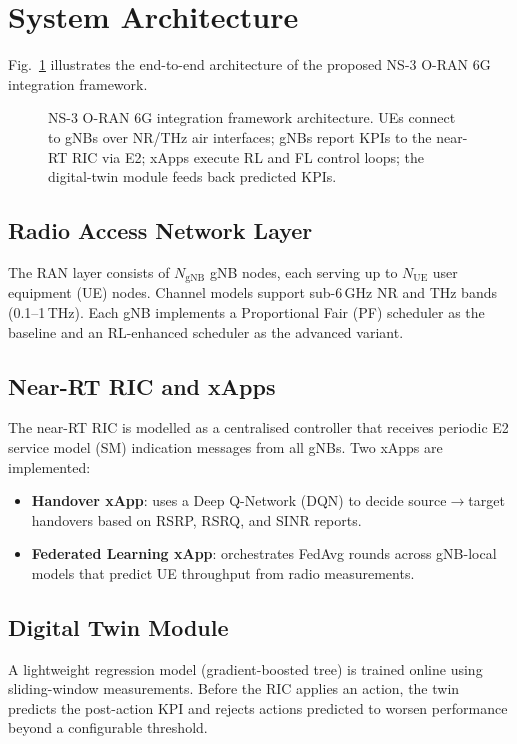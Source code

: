 \section{System Architecture}
\label{sec:architecture}

Fig.~\ref{fig:architecture} illustrates the end-to-end architecture of the
proposed NS-3 O-RAN 6G integration framework.

\begin{figure}[htbp]
  \centering
  
  \caption{NS-3 O-RAN 6G integration framework architecture. UEs connect
           to gNBs over NR/THz air interfaces; gNBs report KPIs to the
           near-RT RIC via E2; xApps execute RL and FL control loops;
           the digital-twin module feeds back predicted KPIs.}
  \label{fig:architecture}
\end{figure}

\subsection{Radio Access Network Layer}
The RAN layer consists of \(N_{\text{gNB}}\) gNB nodes, each serving up
to \(N_{\text{UE}}\) user equipment (UE) nodes.
Channel models support sub-6\,GHz NR and THz bands (0.1--1\,THz).
Each gNB implements a Proportional Fair (PF) scheduler as the baseline and
an RL-enhanced scheduler as the advanced variant.

\subsection{Near-RT RIC and xApps}
The near-RT RIC is modelled as a centralised controller that receives
periodic E2 service model (SM) indication messages from all gNBs.
Two xApps are implemented:
\begin{itemize}
  \item \textbf{Handover xApp}: uses a Deep Q-Network (DQN) to decide
        source$\to$target handovers based on RSRP, RSRQ, and SINR reports.
  \item \textbf{Federated Learning xApp}: orchestrates FedAvg rounds across
        gNB-local models that predict UE throughput from radio measurements.
\end{itemize}

\subsection{Digital Twin Module}
A lightweight regression model (gradient-boosted tree) is trained online
using sliding-window measurements.
Before the RIC applies an action, the twin predicts the post-action KPI
and rejects actions predicted to worsen performance beyond a configurable
threshold.

